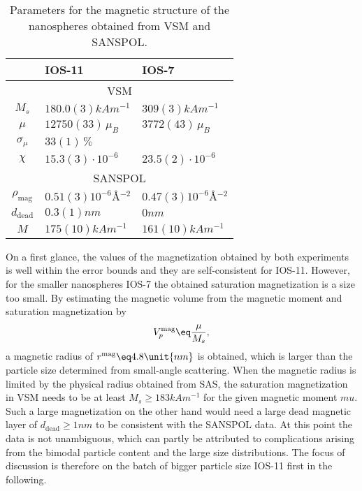 \documentclass[\main/dresen_thesis.tex]{subfiles}
\begin{document}
\begin{table}[tb]
  \centering
  \caption{\label{tab:looselyPackedNP:nanoparticle:vsmSanspol}Parameters for the magnetic structure of the nanospheres obtained from VSM and SANSPOL.}
  \begin{tabular}{ c | l | l }
      & IOS-11 & IOS-7 \\
    \hline
    \multicolumn{3}{c}{VSM}\\
    \hline
    $M_s$
      & $180.0(3) \unit{kAm^{-1}}$
      & $309(3) \unit{kAm^{-1}}$\\
    $\mu$
      & $12750(33) \, \mu_B$
      & $3772(43) \, \mu_B$\\
    $\sigma_{\mu}$
      & $33(1) \, \%$
      & \\
    $\chi$
      & $15.3(3) \cdot \unit{10^{-6}}$
      & $23.5(2) \cdot \unit{10^{-6}}$\\
    \hline
    \multicolumn{3}{c}{SANSPOL}\\
    \hline
    $\rho_\mathrm{mag}$
      & $0.51(3) \unit{10^{-6} \angstrom^{-2}}$
      & $0.47(3) \unit{10^{-6} \angstrom^{-2}}$\\
    $d_\mathrm{dead}$
      & $0.3(1) \unit{nm}$
      & $0 \unit{nm}$\\
    $M$
      & $175(10) \unit{kAm^{-1}}$
      & $161(10) \unit{kAm^{-1}}$\\
    \hline
  \end{tabular}
\end{table}

On a first glance, the values of the magnetization obtained by both experiments is well within the error bounds and they are self-consistent for IOS-11.
However, for the smaller nanospheres IOS-7 the obtained saturation magnetization is a size too small.
By estimating the magnetic volume from the magnetic moment and saturation magnetization by
\begin{align}
  V_p^\mathrm{mag} \eq \frac{\mu}{M_s},
\end{align}
a magnetic radius of $r^\mathrm{mag} \eq 4.8 \unit{nm}$ is obtained, which is larger than the particle size determined from small-angle scattering.
When the magnetic radius is limited by the physical radius obtained from SAS, the saturation magnetization in VSM needs to be at least $M_s \geq 183 \unit{kAm^{-1}}$ for the given magnetic moment $mu$.
Such a large magnetization on the other hand would need a large dead magnetic layer of $d_\mathrm{dead} \geq 1 \unit{nm}$ to be consistent with the SANSPOL data.
At this point the data is not unambiguous, which can partly be attributed to complications arising from the bimodal particle content and the large size distributions.
The focus of discussion is therefore on the batch of bigger particle size IOS-11 first in the following.
\end{document}
